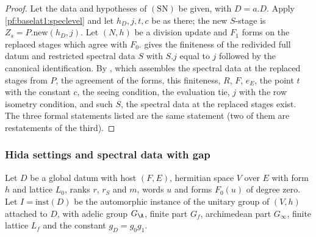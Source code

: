\begin{proof}
Let the data and hypotheses of $(\mathrm{SN})$ be given, with $D=a.D$. Apply \cref{pf:baselat1:speclevel} and let
$h_D,j,t,c$ be as there; the new $S$-stage is $Z_s=P.\mathrm{new}(h_D,j)$. Let $(N,h)$ be a division update and $F_1$
forms on the replaced stages which agree with $F_0$.  gives the finiteness of the
redivided full datum and restricted spectral data $S$ with $S.j$ equal to $j$ followed by the canonical
identification. By , which assembles the spectral data at the
replaced stages from $P$, the agreement of the forms, this finiteness, $R$, $F$, $e_E$, the point $t$ with the constant
$c$, the seeing condition, the evaluation tie, $j$ with the row isometry condition, and such $S$, the spectral data at
the replaced stages exist. The three formal statements listed are the same statement (two of them are restatements
of the third).
\end{proof}

\subsubsection{Hida settings and spectral data with gap}\label{pf:baselat1:sssec:hidaproofs}

Let $D$ be a global datum with host $(F,E)$, hermitian space $V$ over $E$ with form $h$ and lattice $L_0$, ranks $r$, $r_S$ and
$m$, words $u$ and forms $F_0(u)$ of degree zero. Let $I=\mathrm{inst}(D)$ be the automorphic instance of the unitary
group of $(V,h)$ attached to $D$, with adelic group $G_{\A}$, finite part $G_f$, archimedean part $G_\infty$, finite
lattice $L_f$ and the constant $g_D=g_0g_1$.

